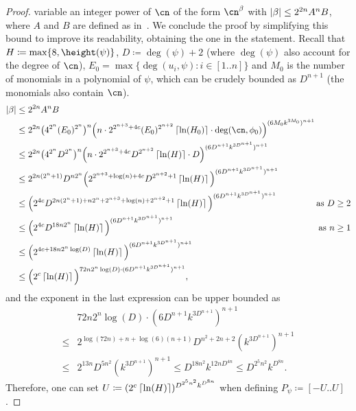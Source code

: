 \begin{proof}
  variable an integer power of $\cn$ of the form $\cn^\beta$ with $\left|\beta\right|
  \leq 2^{2n}A^nB$, where $A$ and $B$ are defined as
  in~.
  We conclude the
  proof by simplifying this bound to improve its readability, obtaining the one
  in the statement. 
  Recall that $H \coloneqq \max\{8,\height(\psi)\}$,
  $D \coloneqq \deg(\psi)+2$  
  (where $\deg(\psi)$ also account for the degree of $\cn$),
  $E_0 = \max\{\deg(u_i,\psi) : i
  \in [1..n]\}$ 
  and $M_0$ is the number of monomials in a polynomial of $\psi$, 
  which can be crudely bounded as $D^{n+1}$ (the monomials also contain $\cn$).
  \begin{align*}
    \abs{\beta} 
      &\leq 2^{2n}A^nB\\
      &\leq 2^{2n}\big(4^{2^n} (E_0)^{2^n}\big)^n  \Big(n \cdot
      2^{2^{n+3}+4c}(E_0)^{2^{n+2}} \ceil{\ln(H_0)} \cdot \deg(\cn,\phi_0)
      \Big)^{(6M_0k^{3M_0})^{n+1}}\\
      &\leq 2^{2n}\big(4^{2^n} D^{2^n}\big)^n  \Big(n \cdot
      2^{2^{n+3}+4c}D^{2^{n+2}} \ceil{\ln(H)} \cdot D
      \Big)^{(6D^{n+1}k^{3D^{n+1}})^{n+1}}\\
      &\leq 2^{2n(2^n+1)} D^{n2^n}  \Big(
      2^{2^{n+3}+\log(n)+4c}D^{2^{n+2}+1} \ceil{\ln(H)}
      \Big)^{(6D^{n+1}k^{3D^{n+1}})^{n+1}}\\
      &\leq \Big(
      2^{4c}D^{2n(2^n+1) + n2^n + 2^{n+3} + \log(n) + 2^{n+2}+1} \ceil{\ln(H)}
      \Big)^{(6D^{n+1}k^{3D^{n+1}})^{n+1}}
      &\hspace{-0.3cm}\text{as } D \geq 2\\
      &\leq \Big(
      2^{4c}D^{18n2^n} \ceil{\ln(H)}
      \Big)^{(6D^{n+1}k^{3D^{n+1}})^{n+1}}
      &\hspace{-0.3cm}\text{as } n \geq 1\\
      &\leq \Big(
      2^{4c+18n2^n\log(D)} \ceil{\ln(H)}
      \Big)^{(6D^{n+1}k^{3D^{n+1}})^{n+1}}\\
      &\leq \Big(
      2^{c} \ceil{\ln(H)}
      \Big)^{72 n2^n\log(D) \cdot (6D^{n+1}k^{3D^{n+1}})^{n+1}},
  \end{align*}
  and the exponent in the last expression can be upper bounded as 
  \begin{align*}
      &72 n2^n\log(D) \cdot (6D^{n+1}k^{3D^{n+1}})^{n+1}\\
    \leq{}&2^{\log(72n)+n+\log(6)(n+1)}D^{n^2+2n+2}(k^{3D^{n+1}})^{n+1}\\
    \leq{}&2^{13n}D^{5n^2}(k^{3D^{n+1}})^{n+1} \leq D^{18n^2}k^{12nD^{4n}}
    \leq D^{2^5n^2}k^{D^{8n}}.
  \end{align*}
  Therefore, one can set $U \coloneqq (2^c \left\lceil\ln(H)\right\rceil)^{D^{2^5 n^2} k^{D^{8n}}}$ 
  when defining $P_{\psi} \coloneqq [-U..U]$. 
\end{proof}
